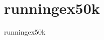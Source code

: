 \section{runningex50k}
\label{sec:datasets:runningex50k}
\begin{datasetDescription}{runningex50k}
\end{datasetDescription}

